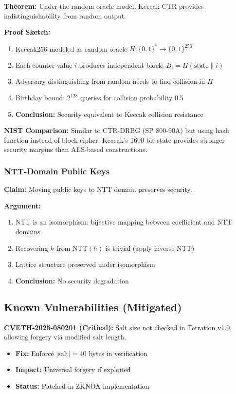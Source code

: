 \documentclass[11pt,a4paper]{article}
\begin{document}
\textbf{Theorem:} Under the random oracle model, Keccak-CTR provides indistinguishability from random output.

\textbf{Proof Sketch:}
\begin{enumerate}
    \item Keccak256 modeled as random oracle $H: \{0,1\}^* \rightarrow \{0,1\}^{256}$
    \item Each counter value $i$ produces independent block: $B_i = H(\text{state} \| i)$
    \item Adversary distinguishing from random needs to find collision in $H$
    \item Birthday bound: $2^{128}$ queries for collision probability 0.5
    \item \textbf{Conclusion:} Security equivalent to Keccak collision resistance
\end{enumerate}

\textbf{NIST Comparison:} Similar to CTR-DRBG (SP 800-90A) but using hash function instead of block cipher. Keccak's 1600-bit state provides stronger security margins than AES-based constructions.

\subsubsection{NTT-Domain Public Keys}

\textbf{Claim:} Moving public keys to NTT domain preserves security.

\textbf{Argument:}
\begin{enumerate}
    \item NTT is an isomorphism: bijective mapping between coefficient and NTT domains
    \item Recovering $h$ from $\text{NTT}(h)$ is trivial (apply inverse NTT)
    \item Lattice structure preserved under isomorphism
    \item \textbf{Conclusion:} No security degradation
\end{enumerate}

\subsection{Known Vulnerabilities (Mitigated)}

\textbf{CVETH-2025-080201 (Critical):} Salt size not checked in Tetration v1.0, allowing forgery via modified salt length.
\begin{itemize}
    \item \textbf{Fix:} Enforce $|\text{salt}| = 40$ bytes in verification
    \item \textbf{Impact:} Universal forgery if exploited
    \item \textbf{Status:} Patched in ZKNOX implementation
\end{itemize}
\end{document}
